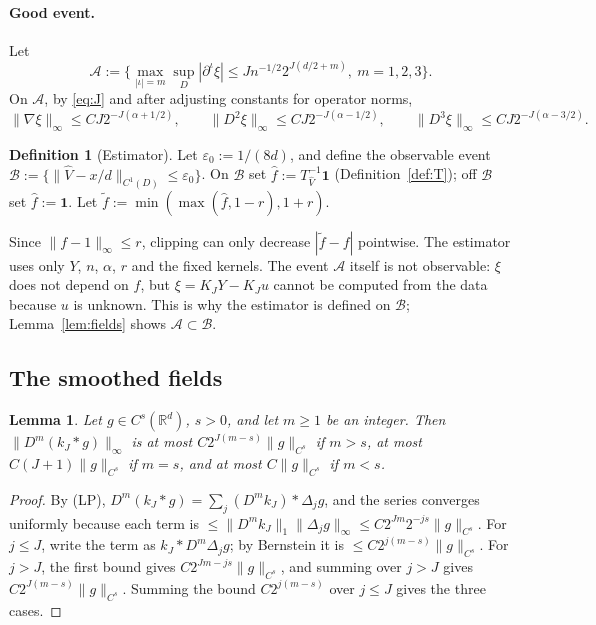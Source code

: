 \documentclass[11pt]{article}
\newtheorem{lemma}[theorem]{Lemma}
\theoremstyle{definition}
\newtheorem{definition}[theorem]{Definition}
\theoremstyle{remark}
\newcommand{\R}{\mathbb R}
\newcommand{\one}{\mathbf 1}
\newcommand{\cA}{\mathcal A}
\newcommand{\cB}{\mathcal B}
\begin{document}
\paragraph{Good event.} Let
\[
\cA:=\Big\{\max_{|\iota|=m}\sup_D|\partial^\iota\xi|\le Jn^{-1/2}2^{J(d/2+m)},\ m=1,2,3\Big\}.
\]
On $\cA$, by \eqref{eq:J} and after adjusting constants for operator norms,
\begin{equation}\label{eq:xi}
\|\nabla\xi\|_\infty\le CJ2^{-J(\alpha+1/2)},\qquad\|D^2\xi\|_\infty\le CJ2^{-J(\alpha-1/2)},\qquad\|D^3\xi\|_\infty\le CJ2^{-J(\alpha-3/2)} .
\end{equation}

\begin{definition}[Estimator]\label{def:est}
Let $\varepsilon_0:=1/(8d)$, and define the observable event $\cB:=\{\|\hat V-x/d\|_{C^1(D)}\le\varepsilon_0\}$. On $\cB$ set $\hat f:=T^{-1}_{\hat V}\one$ (Definition~\ref{def:T}); off $\cB$ set $\hat f:=\one$. Let $\tilde f:=\min(\max(\hat f,1-r),1+r)$.
\end{definition}


Since $\|f-1\|_\infty\le r$, clipping can only decrease $|\tilde f-f|$ pointwise. The estimator uses only $Y$, $n$, $\alpha$, $r$ and the fixed kernels. The event $\cA$ itself is not observable: $\xi$ does not depend on $f$, but $\xi=K_JY-K_Ju$ cannot be computed from the data because $u$ is unknown. This is why the estimator is defined on $\cB$; Lemma~\ref{lem:fields} shows $\cA\subset\cB$.

\subsection{The smoothed fields}

\begin{lemma}\label{lem:LP}
Let $g\in C^s(\R^d)$, $s>0$, and let $m\ge1$ be an integer. Then $\|D^m(k_J*g)\|_\infty$ is at most $C2^{J(m-s)}\|g\|_{C^s}$ if $m>s$, at most $C(J+1)\|g\|_{C^s}$ if $m=s$, and at most $C\|g\|_{C^s}$ if $m<s$.
\end{lemma}

\begin{proof}
By (LP), $D^m(k_J*g)=\sum_j(D^mk_J)*\Delta_jg$, and the series converges uniformly because each term is $\le\|D^mk_J\|_1\|\Delta_jg\|_\infty\le C2^{Jm}2^{-js}\|g\|_{C^s}$. For $j\le J$, write the term as $k_J*D^m\Delta_jg$; by Bernstein it is $\le C2^{j(m-s)}\|g\|_{C^s}$. For $j>J$, the first bound gives $C2^{Jm-js}\|g\|_{C^s}$, and summing over $j>J$ gives $C2^{J(m-s)}\|g\|_{C^s}$. Summing the bound $C2^{j(m-s)}$ over $j\le J$ gives the three cases.
\end{proof}
\end{document}

